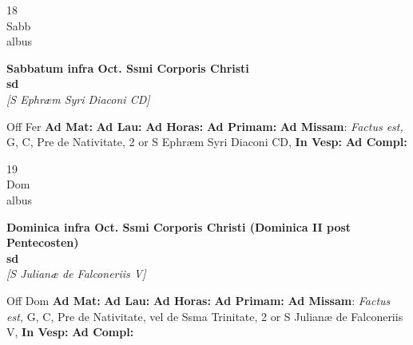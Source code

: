 \documentclass[10pt, openany]{book}
\begin{document}
    \begin{center}
        \begin{minipage}{3.5in}
            \vspace{2em}
            \begin{minipage}{0.5in}
                {\Huge 18} \\
                {\normalsize Sabb} \\
                {\normalsize albus}
            \end{minipage}
            \begin{minipage}{3.0in}
                \textbf{ \large Sabbatum infra Oct. Ssmi Corporis Christi \\
                \textnormal{\normalsize sd}} \\ \textit{[S Ephræm Syri Diaconi CD]} \\ 
            \end{minipage}
            \begin{justify}Off Fer
                \textbf{Ad Mat: }
                \textbf{Ad Lau: }
                \textbf{Ad Horas: }
                \textbf{Ad Primam: }\textbf{Ad Missam}: \textit{Factus est,} G, C, Pre de Nativitate, 2 or S Ephræm Syri Diaconi CD,  
                \textbf{In Vesp: }
                \textbf{Ad Compl: }
            \end{justify}
        \end{minipage}
    \end{center}

    \begin{center}
        \begin{minipage}{3.5in}
            \vspace{2em}
            \begin{minipage}{0.5in}
                {\Huge 19} \\
                {\normalsize Dom} \\
                {\normalsize albus}
            \end{minipage}
            \begin{minipage}{3.0in}
                \textbf{ \large Dominica infra Oct. Ssmi Corporis Christi (Dominica II post Pentecosten) \\
                \textnormal{\normalsize sd}} \\ \textit{[S Julianæ de Falconeriis V]} \\ 
            \end{minipage}
            \begin{justify}Off Dom
                \textbf{Ad Mat: }
                \textbf{Ad Lau: }
                \textbf{Ad Horas: }
                \textbf{Ad Primam: }\textbf{Ad Missam}: \textit{Factus est,} G, C, Pre de Nativitate, vel de Ssma Trinitate, 2 or S Julianæ de Falconeriis V,  
                \textbf{In Vesp: }
                \textbf{Ad Compl: }
            \end{justify}
        \end{minipage}
    \end{center}
\end{document}
